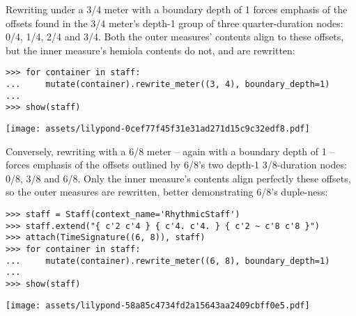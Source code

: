 \noindent Rewriting under a 3/4 meter with a boundary depth of 1 forces
emphasis of the offsets found in the 3/4 meter's depth-1 group of three
quarter-duration nodes: 0/4, 1/4, 2/4 and 3/4. Both the outer measures'
contents align to these offsets, but the inner measure's hemiola contents do
not, and are rewritten:

\begin{comment}
<abjad>
for container in staff:
    mutate(container).rewrite_meter((3, 4), boundary_depth=1)

show(staff)
</abjad>
\end{comment}

\begin{abjadbookoutput}
\begin{singlespacing}
\vspace{-0.5\baselineskip}
\begin{verbatim}
>>> for container in staff:
...     mutate(container).rewrite_meter((3, 4), boundary_depth=1)
...
>>> show(staff)
\end{verbatim}
\noindent\texttt{[image: assets/lilypond-0cef77f45f31e31ad271d15c9c32edf8.pdf]}
\end{singlespacing}
\end{abjadbookoutput}

\noindent Conversely, rewriting with a 6/8 meter -- again with a boundary depth
of 1 -- forces emphasis of the offsets outlined by 6/8's two depth-1
3/8-duration nodes: 0/8, 3/8 and 6/8. Only the inner measure's contents align
perfectly these offsets, so the outer measures are rewritten, better
demonstrating 6/8's duple-ness:

\begin{comment}
<abjad>
staff = Staff(context_name='RhythmicStaff')
staff.extend("{ c'2 c'4 } { c'4. c'4. } { c'2 ~ c'8 c'8 }")
attach(TimeSignature((6, 8)), staff)
for container in staff:
    mutate(container).rewrite_meter((6, 8), boundary_depth=1)

show(staff)
</abjad>
\end{comment}

\begin{abjadbookoutput}
\begin{singlespacing}
\vspace{-0.5\baselineskip}
\begin{verbatim}
>>> staff = Staff(context_name='RhythmicStaff')
>>> staff.extend("{ c'2 c'4 } { c'4. c'4. } { c'2 ~ c'8 c'8 }")
>>> attach(TimeSignature((6, 8)), staff)
>>> for container in staff:
...     mutate(container).rewrite_meter((6, 8), boundary_depth=1)
...
>>> show(staff)
\end{verbatim}
\noindent\texttt{[image: assets/lilypond-58a85c4734fd2a15643aa2409cbff0e5.pdf]}
\end{singlespacing}
\end{abjadbookoutput}

